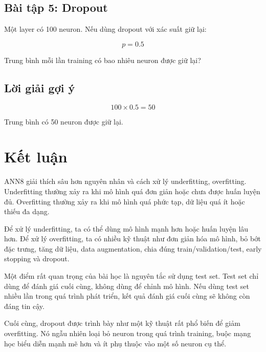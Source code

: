 \documentclass[12pt,a4paper]{report}
\begin{document}
\section*{Bài tập 5: Dropout}

Một layer có 100 neuron. Nếu dùng dropout với xác suất giữ lại:

\[
    p=0.5
\]

Trung bình mỗi lần training có bao nhiêu neuron được giữ lại?

\section*{Lời giải gợi ý}

\[
    100 \times 0.5 = 50
\]

Trung bình có 50 neuron được giữ lại.

\chapter*{Kết luận}

ANN8 giải thích sâu hơn nguyên nhân và cách xử lý underfitting, overfitting. Underfitting thường xảy ra khi mô hình quá đơn giản hoặc chưa được huấn luyện đủ. Overfitting thường xảy ra khi mô hình quá phức tạp, dữ liệu quá ít hoặc thiếu đa dạng.

Để xử lý underfitting, ta có thể dùng mô hình mạnh hơn hoặc huấn luyện lâu hơn. Để xử lý overfitting, ta có nhiều kỹ thuật như đơn giản hóa mô hình, bỏ bớt đặc trưng, tăng dữ liệu, data augmentation, chia đúng train/validation/test, early stopping và dropout.

Một điểm rất quan trọng của bài học là nguyên tắc sử dụng test set. Test set chỉ dùng để đánh giá cuối cùng, không dùng để chỉnh mô hình. Nếu dùng test set nhiều lần trong quá trình phát triển, kết quả đánh giá cuối cùng sẽ không còn đáng tin cậy.

Cuối cùng, dropout được trình bày như một kỹ thuật rất phổ biến để giảm overfitting. Nó ngẫu nhiên loại bỏ neuron trong quá trình training, buộc mạng học biểu diễn mạnh mẽ hơn và ít phụ thuộc vào một số neuron cụ thể.
\end{document}
